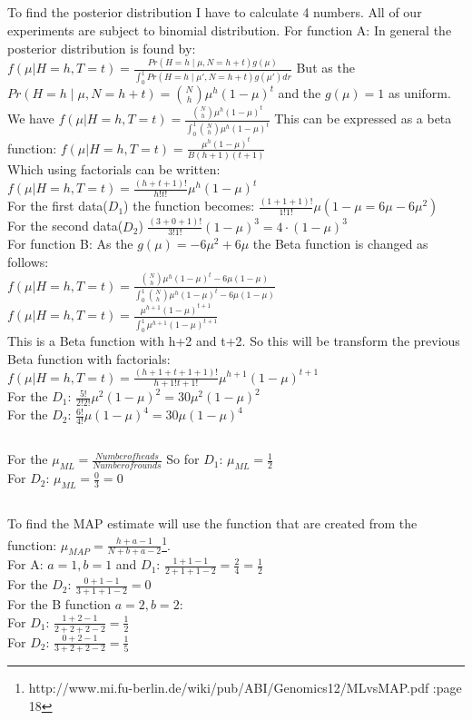 \subsection{}
To find the posterior distribution I have to calculate 4 numbers.
All of our experiments are subject to binomial distribution.
For function A:
In general the posterior distribution is found by:
$f(\mu|H=h,T=t) = \frac{Pr(H=h\mid \mu,N=h+t)g(\mu)}{\int_0^1 Pr(H=h\mid \mu',N=h+t)g(\mu') dr}$
But as the $Pr(H=h\mid \mu,N=h+t) = \binom{N}{h}\mu^h(1-\mu)^t$ and the $g(\mu) =1$ as uniform.
We have $f(\mu|H=h,T=t) = \frac{\binom{N}{h}\mu^h(1-\mu)^t}{\int_0^1 \binom{N}{h}\mu^h(1-\mu)^t}$
This can be expressed as a beta function:
$f(\mu|H=h,T=t) = \frac{\mu^h(1-\mu)^t}{B (h+1)(t+1)}$\\
Which using factorials can be written:
$f(\mu|H=h,T=t) = \frac{(h+t+1)!}{h!t!} \mu^h(1-\mu)^t$\\
For the first data($D_1$) the function becomes:
$ \frac{(1+1+1)!}{1!1!}\mu (1-\mu = 6\mu - 6\mu^2)$\\
For the second data($D_2$)
$\frac{(3+0+1)!}{3!1!}(1-\mu)^3 = 4\cdot (1-\mu)^3$\\
For function B:
As the $g(\mu) = -6\mu^2 + 6\mu$ the Beta function is changed as follows:\\
$f(\mu|H=h,T=t) = \frac{\binom{N}{h}\mu^h(1-\mu)^t -6\mu (1- \mu)}{\int_0^1 \binom{N}{h}\mu^h(1-\mu)^t -6\mu (1- \mu)}$\\
$f(\mu|H=h,T=t) = \frac{\mu^{h+1}(1-\mu)^{t+1}}{\int_0^1 \mu^{h+1}(1-\mu)^{t+1}}$\\
This is a Beta function with h+2 and t+2. So this will be transform the previous Beta function with factorials:
$f(\mu|H=h,T=t) = \frac{(h+1+t+1+1)!}{h+1!t+1!} \mu^{h+1}(1-\mu)^{t+1}$\\
For the $D_1$:
$\frac{5!}{2!2!} \mu^2(1-\mu)^2 = 30\mu^2(1-\mu)^2$\\
For the $D_2$:
$\frac{6!}{4!} \mu(1-\mu)^4 = 30\mu(1-\mu)^4$\\
\subsection{}
For the $\mu_{ML} = \frac{Number of heads}{Number of rounds}$
So for $D_1$: $\mu_{ML} = \frac{1}{2}$\\
For $D_2$: $\mu_{ML} = \frac{0}{3} = 0$\\
\subsection{}
To find the MAP estimate will use the function that are created from the function:
$\mu_{MAP} = \frac{h+a-1}{N+b+a-2}$\footnote{http://www.mi.fu-berlin.de/wiki/pub/ABI/Genomics12/MLvsMAP.pdf :page 18}. \\
For A: $a=1,b=1$ and $D_1$: $\frac{1+1-1}{2+1+1-2} = \frac{2}{4} = \frac{1}{2}$\\
For the $D_2$: $\frac{0+1-1}{3+1+1-2} =0$\\
For the B function $a=2,b=2$:\\
For $D_1$: $\frac{1+2-1}{2+2+2-2} = \frac{1}{2}$\\
For $D_2$: $\frac{0+2-1}{3+2+2-2} = \frac{1}{5}$\\
